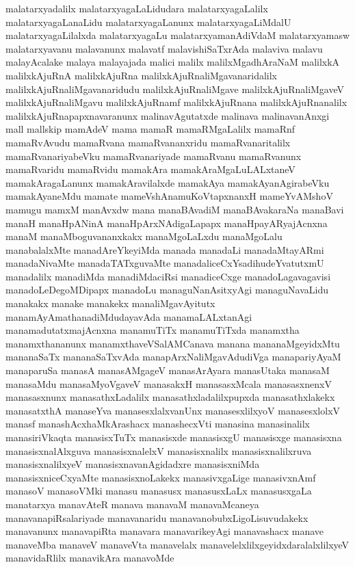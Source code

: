 {malatarxyadalilx
malatarxyagaLaLidudara
malatarxyagaLalilx
malatarxyagaLanaLidu
malatarxyagaLanunx
malatarxyagaLiMdalU
malatarxyagaLilalxda
malatarxyagaLu
malatarxyamanAdiVdaM
malatarxyamasw
malatarxyavanu
malavanunx
malavatf
malavishiSaTxrAda
malaviva
malavu
malayAcalake
malaya
malayajada
malici
malilx
malilxMgadhAraNaM
malilxkA
malilxkAjuRnA
malilxkAjuRna
malilxkAjuRnaliMgavanaridalilx
malilxkAjuRnaliMgavanaridudu
malilxkAjuRnaliMgave
malilxkAjuRnaliMgaveV
malilxkAjuRnaliMgavu
malilxkAjuRnamf
malilxkAjuRnana
malilxkAjuRnanalilx
malilxkAjuRnapapxnavaranunx
malinavAgutatxde
malinava
malinavanAnxgi
mall
mallskip
mamAdeV
mama
mamaR
mamaRMgaLalilx
mamaRnf
mamaRvAvudu
mamaRvana
mamaRvananxridu
mamaRvanaritalilx
mamaRvanariyabeVku
mamaRvanariyade
mamaRvanu
mamaRvanunx
mamaRvaridu
mamaRvidu
mamakAra
mamakAraMgaLuLALxtaneV
mamakAragaLanunx
mamakAravilalxde
mamakAya
mamakAyanAgirabeVku
mamakAyaneMdu
mamate
mameVshAnamuKoVtapxnanxH
mameYvAMshoV
mamugu
mamxM
manAvxdw
mana
manaBAvadiM
manaBAvakaraNa
manaBavi
manaH
manaHpANinA
manaHpArxNAdigaLapapx
manaHpayARyajAcnxna
manaM
manaMboguvananxkakx
manaMgoLaLxdu
manaMgoLalu
manabalalxMte
manadAreYkeyiMda
manada
manadaLi
manadaMtayARmi
manadaNivaMte
manadaTATxguvaMte
manadaliceCxYsadihudeYvatutxmU
manadalilx
manadiMda
manadiMdaciRsi
manadiceCxge
manadoLagavagavisi
manadoLeDegoMDipapx
manadoLu
managuNanAsitxyAgi
managuNavaLidu
manakakx
manake
manakekx
manaliMgavAyitutx
manamAyAmathanadiMdudayavAda
manamaLALxtanAgi
manamadutatxmajAcnxna
manamuTiTx
manamuTiTxda
manamxtha
manamxthananunx
manamxthaveVSalAMCanava
manana
mananaMgeyidxMtu
mananaSaTx
mananaSaTxvAda
manapArxNaliMgavAdudiVga
manapariyAyaM
manaparuSa
manasA
manasAMgageV
manasArAyara
manasUtaka
manasaM
manasaMdu
manasaMyoVgaveV
manasakxH
manasasxMcala
manasasxnenxV
manasasxnunx
manasathxLadalilx
manasathxladalilxpupxda
manasathxlakekx
manasatxthA
manaseYva
manasesxlalxvanUnx
manasesxlilxyoV
manasesxlolxV
manasf
manashAcxhaMkArashacx
manashecxVti
manasina
manasinalilx
manasiriVkaqta
manasisxTuTx
manasisxde
manasisxgU
manasisxge
manasisxna
manasisxnalAlxguva
manasisxnalelxV
manasisxnalilx
manasisxnalilxruva
manasisxnalilxyeV
manasisxnavanAgidadxre
manasisxniMda
manasisxniceCxyaMte
manasisxnoLakekx
manasivxgaLige
manasivxnAmf
manasoV
manasoVMki
manasu
manasusx
manasusxLaLx
manasusxgaLa
manatarxya
manavAteR
manava
manavaM
manavaMcaneya
manavanapiRsalariyade
manavanaridu
manavanobubxLigoLisuvudakekx
manavanunx
manavapiRta
manavara
manavarikeyAgi
manavashacx
manave
manaveMba
manaveV
manaveVta
manavelalx
manavelelxlilxgeyidxdaralalxlilxyeV
manavidaRlilx
manavikAra
manavoMde
}
